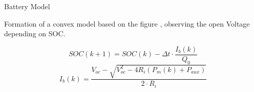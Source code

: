 \documentclass{beamer}
\begin{document}
\begin{frame}{Battery Model}

    \begin{block}{ }
        Formation of a convex model based on the figure , observing the open Voltage depending on SOC.
    \end{block}
        
    
    \begin{equation*}
   SOC(k + 1) = SOC(k) - \Delta t \cdot \frac{I_b(k)}{Q_0}
\end{equation*}
\begin{equation*}
   I_b(k) = \frac{V_{oc} −\sqrt{V_{oc}^2- 4 R_i(P_m(k)+P_{aux})}}{2 \cdot R_i} 
\end{equation*}
\end{frame}
\end{document}
